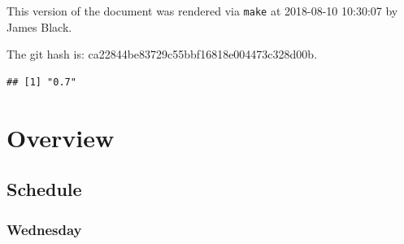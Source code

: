 \documentclass[]{book}
\makeatletter
\newenvironment{Shaded}{\begin{snugshade}}{\end{snugshade}}
\newcommand{\KeywordTok}[1]{\textcolor[rgb]{0.13,0.29,0.53}{\textbf{#1}}}
\newcommand{\NormalTok}[1]{#1}
\newcommand{\OperatorTok}[1]{\textcolor[rgb]{0.81,0.36,0.00}{\textbf{#1}}}
\newcommand{\StringTok}[1]{\textcolor[rgb]{0.31,0.60,0.02}{#1}}
\newenvironment{kframe}{%
\medskip{}
\setlength{\fboxsep}{.8em}
 \def\at@end@of@kframe{}%
 \ifinner\ifhmode%
  \def\at@end@of@kframe{\end{minipage}}%
  \begin{minipage}{\columnwidth}%
 \fi\fi%
 \def\FrameCommand##1{\hskip\@totalleftmargin \hskip-\fboxsep
 \colorbox{shadecolor}{##1}\hskip-\fboxsep
     \hskip-\linewidth \hskip-\@totalleftmargin \hskip\columnwidth}%
 \MakeFramed {\advance\hsize-\width
   \@totalleftmargin\z@ \linewidth\hsize
   \@setminipage}}%
 {\par\unskip\endMakeFramed%
 \at@end@of@kframe}
\renewenvironment{Shaded}{\begin{kframe}}{\end{kframe}}
\theoremstyle{definition}
\theoremstyle{definition}
\theoremstyle{definition}
\theoremstyle{remark}
\makeatother
\begin{document}
This version of the document was rendered via \texttt{make} at
2018-08-10 10:30:07 by James Black.

The git hash is: ca22844be83729c55bbf16818e004473c328d00b.

\begin{Shaded}
\end{Shaded}

\begin{verbatim}
## [1] "0.7"
\end{verbatim}

\hypertarget{part-overview}{%
\part{Overview}\label{part-overview}}

\hypertarget{schedule}{%
\chapter{Schedule}\label{schedule}}

\hypertarget{wednesday}{%
\section{Wednesday}\label{wednesday}}
\end{document}

